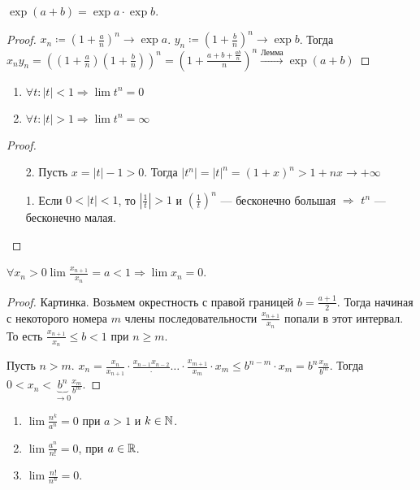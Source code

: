 \begin{theorem}
    $\exp(a+b) = \exp a \cdot \exp b$.
\end{theorem}
\begin{proof}
    $x_n \coloneqq \left(1+\frac{a}{n}\right)^n \to \exp a$. $y_n \coloneqq (1 + \frac{b}{n})^n \to \exp b$. Тогда $x_ny_n = \left((1+\frac{a}{n})(1+\frac{b}{n})\right)^n = \left(1+\frac{a+b+\frac{ab}{n}}{n}\right)^n \xrightarrow{\text{Лемма}} \exp(a+b)$
\end{proof}
\begin{consequence}
    \slashn
    \begin{enumerate}
        \item $\forall t: |t| < 1 \Rightarrow \lim t^n = 0$
        \item  $\forall t: |t| > 1 \Rightarrow \lim t^n = \infty$
    \end{enumerate}
\end{consequence}
\begin{proof}
    \slashn
    \begin{enumerate}
        \item[2.] Пусть $x = |t| - 1 > 0$. Тогда  $|t^n| = |t|^n = (1+x)^n > 1+nx \to +\infty$
        \item[1.] Если $0<|t|<1$, то  $|\frac{1}{t}| > 1$ и $\left(\frac{1}{t}\right)^n$ --- бесконечно большая $\Rightarrow$ $t^n$ --- бесконечно малая. 
    \end{enumerate}
\end{proof}
\begin{theorem}
    $\forall x_n > 0 \lim \frac{x_{n+1}}{x_n} = a < 1 \Rightarrow \lim x_n = 0$.
\end{theorem}
\begin{proof}
    Картинка. Возьмем окрестность с правой границей $b = \frac{a+1}{2}$. Тогда начиная с некоторого номера $m$ члены последовательности  $\frac{x_{n+1}}{x_n}$ попали в этот интервал. То есть $\frac{x_{n+1}}{x_n} \le b < 1$ при $n \ge m$. 

    Пусть $n > m$.  $x_n = \frac{x_n}{x_{n+1}} \cdot \frac{x_{n-1}{x_{n-2}}}\cdot\ldots\cdot\frac{x_{m+1}}{x_m} \cdot x_m \le b^{n-m}\cdot x_m = b^n \frac{x_m}{b^m}$. Тогда $0 < x_n < \underbrace{b^n}_{\to 0}\frac{x_m}{b^m}$. 
\end{proof}
\begin{consequence}
    \slashn
     \begin{enumerate}
         \item $\lim \frac{n^k}{a^n} = 0$ при $a>1$ и  $k \in \mathbb{N}$. 
         \item $\lim \frac{a^n}{n!} = 0$, при $a \in \mathbb{R}$.
         \item $\lim \frac{n!}{n^n} = 0$.
    \end{enumerate}
\end{consequence}
